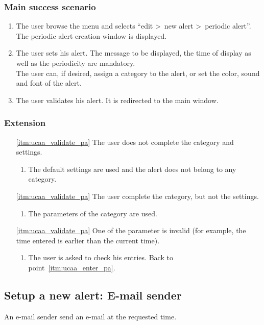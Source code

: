 \subsubsection{Main success scenario}
\begin{enumerate}
	\item The user browse the menu and selects ``edit \textgreater~new alert \textgreater~periodic alert''. The periodic alert creation window is displayed. 
	\item\label{itm:ucaa_enter_pa} The user sets his alert. The message to be displayed, the time of display as well as the periodicity are mandatory. \\The user can, if desired, assign a category to the alert, or set the color, sound and font of the alert.
	\item\label{itm:ucaa_validate_pa} The user validates his alert. It is redirected to the main window.
\end{enumerate}
\subsubsection{Extension}
\begin{enumerate}
	\item[\ref{itm:ucaa_validate_pa}] The user does not complete the category and settings.
	\begin{enumerate}[i]
		\item The default settings are used and the alert does not belong to any category.
	\end{enumerate}
	\item[\ref{itm:ucaa_validate_pa}] The user complete the category, but not the settings.
	\begin{enumerate}[i]
		\item The parameters of the category are used.
	\end{enumerate}
	\item[\ref{itm:ucaa_validate_pa}] One of the parameter is invalid (for example, the time entered is earlier than the current time).
	\begin{enumerate}[i]
		\item The user is asked to check his entries. Back to point~\ref{itm:ucaa_enter_pa}.
	\end{enumerate}
\end{enumerate}

\subsection{Setup a new alert: E-mail sender}
An e-mail sender send an e-mail at the requested time.
